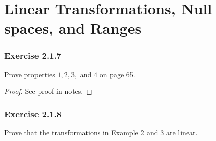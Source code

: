 \section{Linear Transformations, Null spaces, and Ranges}


\subsubsection{Exercise 2.1.7} Prove properties \( 1,2,3, \) and \( 4 \) on page 65.
\begin{proof}
See proof in notes.
\end{proof}

\subsubsection{Exercise 2.1.8} Prove that the transformations in Example 2 and 3 are linear.

